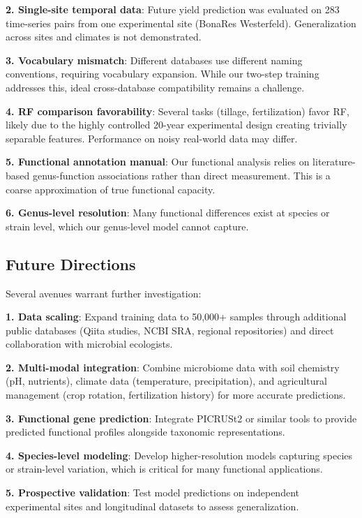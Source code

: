 \documentclass[11pt,a4paper]{article}
\begin{document}
\textbf{2. Single-site temporal data}: Future yield prediction was evaluated on 283 time-series pairs from one experimental site (BonaRes Westerfeld). Generalization across sites and climates is not demonstrated.

\textbf{3. Vocabulary mismatch}: Different databases use different naming conventions, requiring vocabulary expansion. While our two-step training addresses this, ideal cross-database compatibility remains a challenge.

\textbf{4. RF comparison favorability}: Several tasks (tillage, fertilization) favor RF, likely due to the highly controlled 20-year experimental design creating trivially separable features. Performance on noisy real-world data may differ.

\textbf{5. Functional annotation manual}: Our functional analysis relies on literature-based genus-function associations rather than direct measurement. This is a coarse approximation of true functional capacity.

\textbf{6. Genus-level resolution}: Many functional differences exist at species or strain level, which our genus-level model cannot capture.

\subsection{Future Directions}

Several avenues warrant further investigation:

\textbf{1. Data scaling}: Expand training data to 50,000+ samples through additional public databases (Qiita studies, NCBI SRA, regional repositories) and direct collaboration with microbial ecologists.

\textbf{2. Multi-modal integration}: Combine microbiome data with soil chemistry (pH, nutrients), climate data (temperature, precipitation), and agricultural management (crop rotation, fertilization history) for more accurate predictions.

\textbf{3. Functional gene prediction}: Integrate PICRUSt2 or similar tools to provide predicted functional profiles alongside taxonomic representations.

\textbf{4. Species-level modeling}: Develop higher-resolution models capturing species or strain-level variation, which is critical for many functional applications.

\textbf{5. Prospective validation}: Test model predictions on independent experimental sites and longitudinal datasets to assess generalization.
\end{document}

